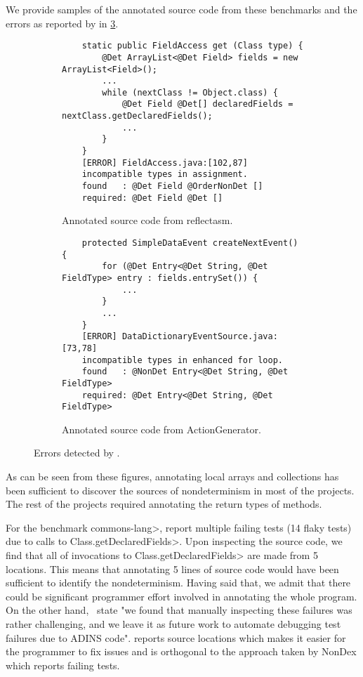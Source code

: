 We provide samples of the annotated source code from these benchmarks and the errors as reported by \TheDeterminismChecker 
in \cref{fig:nondex-source}.
\begin{figure}
    \centering
    \begin{subfigure}[b]{0.95\textwidth}
        \begin{verbatim}
    static public FieldAccess get (Class type) {
        @Det ArrayList<@Det Field> fields = new ArrayList<Field>();
        ...
        while (nextClass != Object.class) {
            @Det Field @Det[] declaredFields = nextClass.getDeclaredFields();
            ...
        }
    }
    [ERROR] FieldAccess.java:[102,87] 
    incompatible types in assignment.
    found   : @Det Field @OrderNonDet []
    required: @Det Field @Det []
        \end{verbatim}
        \caption{Annotated source code from reflectasm. \vspace{0.5cm}}
        \label{code-reflectasm}
    \end{subfigure}

    \begin{subfigure}[b]{0.95\textwidth}
        \begin{verbatim}
    protected SimpleDataEvent createNextEvent() {
        for (@Det Entry<@Det String, @Det FieldType> entry : fields.entrySet()) {
            ...
        }
        ...
    }
    [ERROR] DataDictionaryEventSource.java:[73,78] 
    incompatible types in enhanced for loop.
    found   : @NonDet Entry<@Det String, @Det FieldType>
    required: @Det Entry<@Det String, @Det FieldType>
        \end{verbatim}
        \caption{Annotated source code from ActionGenerator.}
        \label{code-actiongenerator}
    \end{subfigure}    
    \caption{Errors detected by \TheDeterminismChecker.}
    \label{fig:nondex-source}
\end{figure}
As can be seen from these figures, annotating local arrays and collections
has been sufficient to discover the sources of nondeterminism in most of the projects.
The rest of the projects required annotating the return types of methods.

For the benchmark \<commons-lang>, \cite{nondex} report multiple failing tests (14 flaky tests) due to calls
to \<Class.getDeclaredFields>. Upon inspecting the source code, we find that all of invocations to
\<Class.getDeclaredFields> are made from 5 locations. This means that annotating 5 lines of source code
would have been sufficient to identify the nondeterminism. Having said that, we admit that there could be
significant programmer effort involved in annotating the whole program. On the other hand,~\cite{nondex}
state "we found that manually inspecting these failures was
rather challenging, and we leave it as future work to automate
debugging test failures due to ADINS code". \TheDeterminismChecker reports source locations
which makes it easier for the programmer to fix issues and is orthogonal to the approach taken by NonDex which
reports failing tests.

